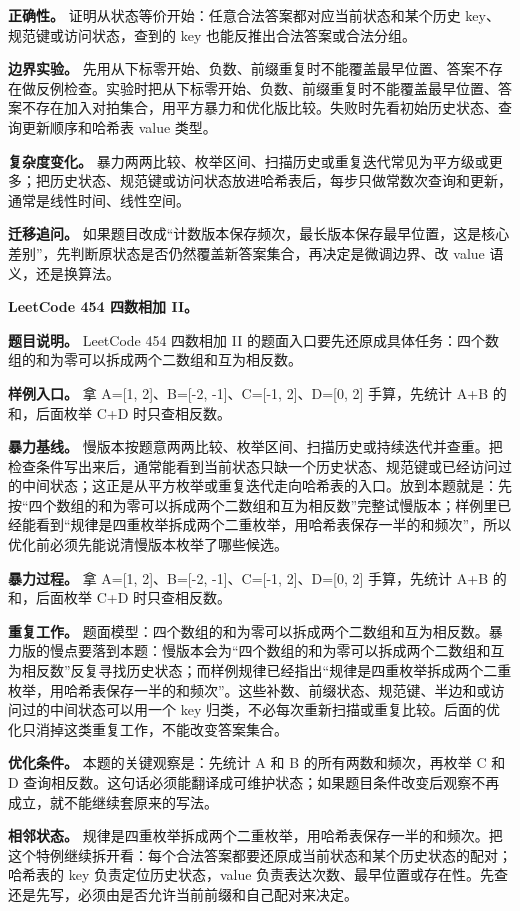 \textbf{正确性。} 证明从状态等价开始：任意合法答案都对应当前状态和某个历史 key、规范键或访问状态，查到的 key 也能反推出合法答案或合法分组。

\textbf{边界实验。} 先用从下标零开始、负数、前缀重复时不能覆盖最早位置、答案不存在做反例检查。实验时把从下标零开始、负数、前缀重复时不能覆盖最早位置、答案不存在加入对拍集合，用平方暴力和优化版比较。失败时先看初始历史状态、查询更新顺序和哈希表 value 类型。

\textbf{复杂度变化。} 暴力两两比较、枚举区间、扫描历史或重复迭代常见为平方级或更多；把历史状态、规范键或访问状态放进哈希表后，每步只做常数次查询和更新，通常是线性时间、线性空间。

\textbf{迁移追问。} 如果题目改成“计数版本保存频次，最长版本保存最早位置，这是核心差别”，先判断原状态是否仍然覆盖新答案集合，再决定是微调边界、改 value 语义，还是换算法。

\noindent\textbf{LeetCode 454 四数相加 II。}

\textbf{题目说明。} LeetCode 454 四数相加 II 的题面入口要先还原成具体任务：四个数组的和为零可以拆成两个二数组和互为相反数。

\textbf{样例入口。} 拿 A=[1, 2]、B=[-2, -1]、C=[-1, 2]、D=[0, 2] 手算，先统计 A+B 的和，后面枚举 C+D 时只查相反数。

\textbf{暴力基线。} 慢版本按题意两两比较、枚举区间、扫描历史或持续迭代并查重。把检查条件写出来后，通常能看到当前状态只缺一个历史状态、规范键或已经访问过的中间状态；这正是从平方枚举或重复迭代走向哈希表的入口。放到本题就是：先按“四个数组的和为零可以拆成两个二数组和互为相反数”完整试慢版本；样例里已经能看到“规律是四重枚举拆成两个二重枚举，用哈希表保存一半的和频次”，所以优化前必须先能说清慢版本枚举了哪些候选。

\textbf{暴力过程。} 拿 A=[1, 2]、B=[-2, -1]、C=[-1, 2]、D=[0, 2] 手算，先统计 A+B 的和，后面枚举 C+D 时只查相反数。

\textbf{重复工作。} 题面模型：四个数组的和为零可以拆成两个二数组和互为相反数。暴力版的慢点要落到本题：慢版本会为“四个数组的和为零可以拆成两个二数组和互为相反数”反复寻找历史状态；而样例规律已经指出“规律是四重枚举拆成两个二重枚举，用哈希表保存一半的和频次”。这些补数、前缀状态、规范键、半边和或访问过的中间状态可以用一个 key 归类，不必每次重新扫描或重复比较。后面的优化只消掉这类重复工作，不能改变答案集合。

\textbf{优化条件。} 本题的关键观察是：先统计 A 和 B 的所有两数和频次，再枚举 C 和 D 查询相反数。这句话必须能翻译成可维护状态；如果题目条件改变后观察不再成立，就不能继续套原来的写法。

\textbf{相邻状态。} 规律是四重枚举拆成两个二重枚举，用哈希表保存一半的和频次。把这个特例继续拆开看：每个合法答案都要还原成当前状态和某个历史状态的配对；哈希表的 key 负责定位历史状态，value 负责表达次数、最早位置或存在性。先查还是先写，必须由是否允许当前前缀和自己配对来决定。

